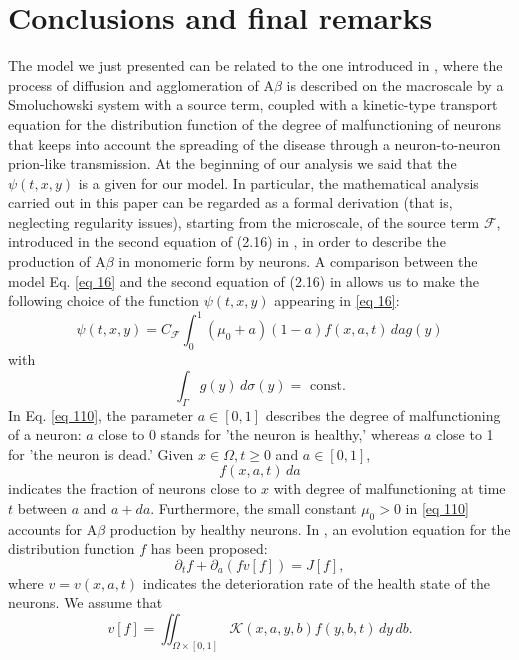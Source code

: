 \section{Conclusions and final remarks}
The model we just presented can be related to the one introduced in \cite{Bertsch}, where the process of diffusion and agglomeration of $\mathrm{A} \beta$ is described on the macroscale by a Smoluchowski system with a source term, coupled with a kinetic-type transport equation for the distribution function of the degree of malfunctioning of neurons that keeps into account the spreading of the disease through a neuron-to-neuron prion-like transmission. At the beginning of our analysis we said that the $\psi(t,x,y)$ is a given for our model. In particular, the mathematical analysis carried out in this paper can be regarded as a formal derivation (that is, neglecting regularity issues), starting from the microscale, of the source term $\mathcal{F}$, introduced in the second equation of (2.16) in \cite{Bertsch}, in order to describe the production of $\mathrm{A} \beta$ in monomeric form by neurons. A comparison between the model Eq. \eqref{eq 16} and the second equation of (2.16) in \cite{Bertsch} allows us to make the following choice of the function $\psi(t, x, y)$ appearing in \eqref{eq 16}:
\begin{equation}
  \psi(t, x, y)=C_{\mathcal{F}} \int_{0}^{1}\left(\mu_{0}+a\right)(1-a) f(x, a, t) \, {d} a g(y)
\label{eq 110}\end{equation}
with
$$
\int_{\Gamma} g(y) \, {d} \sigma(y)=\text { const.}
$$
In Eq. \eqref{eq 110}, the parameter $a \in[0,1]$ describes the degree of malfunctioning of a neuron: $a$ close to 0 stands for 'the neuron is healthy,' whereas $a$ close to 1 for 'the neuron is dead.' Given $x \in \Omega, t \geq 0$ and $a \in[0,1]$,
$$
f(x, a, t) \, {d} a
$$
indicates the fraction of neurons close to $x$ with degree of malfunctioning at time $t$ between $a$ and $a+d a$. Furthermore, the small constant $\mu_{0}>0$ in \eqref{eq 110} accounts for $\mathrm{A} \beta$ production by healthy neurons. In \cite{Bertsch}, an evolution equation for the distribution function $f$ has been proposed:
\begin{equation}
  \partial_{t} f+\partial_{a}(f v[f])=J[f],
\label{eq 111}\end{equation}
where $v=v(x, a, t)$ indicates the deterioration rate of the health state of the neurons. We assume that
\begin{equation}
  v[f]=\iint_{\Omega \times[0,1]} \mathcal{K}(x, a, y, b) f(y, b, t) \, {d} y \, {d} b .
\label{eq 112}\end{equation}
